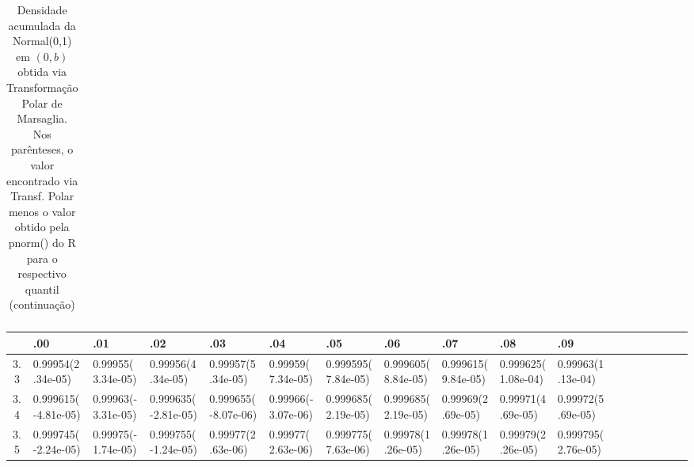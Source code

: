 \documentclass[
	article,			%
	12pt,				%
	twoside,			%
	a4paper,			%
	english,			%
	brazil,				%
	]{abntex2}
\begin{document}
\begin{landscape}
\begin{table}
\begin{tabular}{c||p{18mm}|p{18mm}|p{18mm}|p{18mm}|p{18mm}|p{18mm}|p{18mm}|p{18mm}|p{18mm}|p{18mm}|p{18mm}|p{18mm}|p{18mm}|p{18mm}|p{18mm}|p{18mm}|p{18mm}}
\end{tabular}
\caption{Densidade acumulada da Normal(0,1) em $(0,b)$ obtida via Transformação Polar de Marsaglia. Nos parênteses, o valor encontrado via Transf. Polar menos o valor obtido pela pnorm() do R para o respectivo quantil (continuação)}
\end{table}

\begin{table}\footnotesize
	\begin{tabular}{c||p{18mm}|p{18mm}|p{18mm}|p{18mm}|p{18mm}|p{18mm}|p{18mm}|p{18mm}|p{18mm}|p{18mm}|p{18mm}|p{18mm}|p{18mm}|p{18mm}|p{18mm}|p{18mm}|p{18mm}}
	    			~   & .00 & .01 & .02 & .03 & .04 & .05 & .06 & .07 & .08 & .09\\
    			\hline \hline
  				3.3 &0.99954\newline(2.34e-05)&0.99955\newline(3.34e-05)&0.99956\newline(4.34e-05)&0.99957\newline(5.34e-05)&0.99959\newline(7.34e-05)&0.999595\newline(7.84e-05)&0.999605\newline(8.84e-05)&0.999615\newline(9.84e-05)&0.999625\newline(1.08e-04)&0.99963\newline(1.13e-04)\\\hline
    			3.4 &0.999615\newline(-4.81e-05)&0.99963\newline(-3.31e-05)&0.999635\newline(-2.81e-05)&0.999655\newline(-8.07e-06)&0.99966\newline(-3.07e-06)&0.999685\newline(2.19e-05)&0.999685\newline(2.19e-05)&0.99969\newline(2.69e-05)&0.99971\newline(4.69e-05)&0.99972\newline(5.69e-05)\\\hline
    			3.5 &0.999745\newline(-2.24e-05)&0.99975\newline(-1.74e-05)&0.999755\newline(-1.24e-05)&0.99977\newline(2.63e-06)&0.99977\newline(2.63e-06)&0.999775\newline(7.63e-06)&0.99978\newline(1.26e-05)&0.99978\newline(1.26e-05)&0.99979\newline(2.26e-05)&0.999795\newline(2.76e-05)\\\hline

\end{tabular}
\end{table}
\end{landscape}
\end{document}
